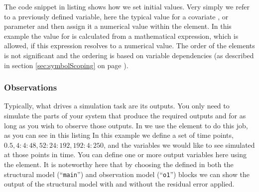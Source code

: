The code snippet in listing 
shows how we set
initial values. Very simply we refer to a previously defined variable,
here the typical value for a covariate , or parameter and then assign
it a numerical value within the  element.
In this example the value for  is
calculated from a mathematical expression, which is allowed, if this expression
resolves to a numerical value.  The order of the 
elements is not significant and the ordering is based on variable
dependencies (as described in section \ref{sec:symbolScoping} on page
\pageref{sec:symbolScoping}).


\subsubsection{Observations}

Typically, what drives a simulation task are its outputs. You only
need to simulate the parts of your system that produce the required
outputs and for as long as you wish to observe those outputs. In
\pharmml we use the  element to do this job, as
you can see in this listing 
In this example we define
a set of time points, $0.5, 4:4:48, 52:24:192, 192:4:250$, and the
variables we would like to see simulated at those points in time. You
can define one or more output variables here using the 
element. It is noteworthy here that by choosing the  defined
in both the structural model (``\texttt{main}'') and observation
model (``\texttt{o1}'') blocks we can show the output of the
structural model with and without the residual error applied.




